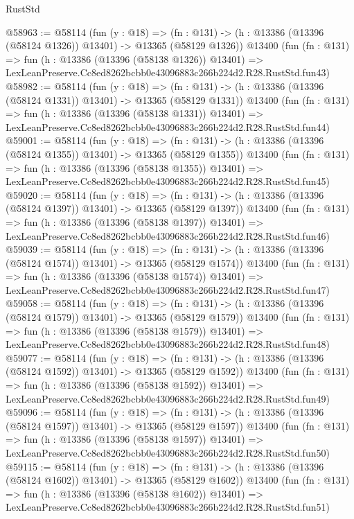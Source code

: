 \begin{lexlean}{RustStd}
\begin{coremodule}
@58963 := @58114
    (fun (y : @18) =>
    (fn : @131) -> (h : @13386 (@13396 (@58124 @1326)) @13401) -> @13365 (@58129 @1326))
    @13400
    (fun (fn : @131) =>
    fun (h : @13386 (@13396 (@58138 @1326)) @13401) =>
    LexLeanPreserve.Cc8ed8262bcbb0e43096883c266b224d2.R28.RustStd.fun43)
@58982 := @58114
    (fun (y : @18) =>
    (fn : @131) -> (h : @13386 (@13396 (@58124 @1331)) @13401) -> @13365 (@58129 @1331))
    @13400
    (fun (fn : @131) =>
    fun (h : @13386 (@13396 (@58138 @1331)) @13401) =>
    LexLeanPreserve.Cc8ed8262bcbb0e43096883c266b224d2.R28.RustStd.fun44)
@59001 := @58114
    (fun (y : @18) =>
    (fn : @131) -> (h : @13386 (@13396 (@58124 @1355)) @13401) -> @13365 (@58129 @1355))
    @13400
    (fun (fn : @131) =>
    fun (h : @13386 (@13396 (@58138 @1355)) @13401) =>
    LexLeanPreserve.Cc8ed8262bcbb0e43096883c266b224d2.R28.RustStd.fun45)
@59020 := @58114
    (fun (y : @18) =>
    (fn : @131) -> (h : @13386 (@13396 (@58124 @1397)) @13401) -> @13365 (@58129 @1397))
    @13400
    (fun (fn : @131) =>
    fun (h : @13386 (@13396 (@58138 @1397)) @13401) =>
    LexLeanPreserve.Cc8ed8262bcbb0e43096883c266b224d2.R28.RustStd.fun46)
@59039 := @58114
    (fun (y : @18) =>
    (fn : @131) -> (h : @13386 (@13396 (@58124 @1574)) @13401) -> @13365 (@58129 @1574))
    @13400
    (fun (fn : @131) =>
    fun (h : @13386 (@13396 (@58138 @1574)) @13401) =>
    LexLeanPreserve.Cc8ed8262bcbb0e43096883c266b224d2.R28.RustStd.fun47)
@59058 := @58114
    (fun (y : @18) =>
    (fn : @131) -> (h : @13386 (@13396 (@58124 @1579)) @13401) -> @13365 (@58129 @1579))
    @13400
    (fun (fn : @131) =>
    fun (h : @13386 (@13396 (@58138 @1579)) @13401) =>
    LexLeanPreserve.Cc8ed8262bcbb0e43096883c266b224d2.R28.RustStd.fun48)
@59077 := @58114
    (fun (y : @18) =>
    (fn : @131) -> (h : @13386 (@13396 (@58124 @1592)) @13401) -> @13365 (@58129 @1592))
    @13400
    (fun (fn : @131) =>
    fun (h : @13386 (@13396 (@58138 @1592)) @13401) =>
    LexLeanPreserve.Cc8ed8262bcbb0e43096883c266b224d2.R28.RustStd.fun49)
@59096 := @58114
    (fun (y : @18) =>
    (fn : @131) -> (h : @13386 (@13396 (@58124 @1597)) @13401) -> @13365 (@58129 @1597))
    @13400
    (fun (fn : @131) =>
    fun (h : @13386 (@13396 (@58138 @1597)) @13401) =>
    LexLeanPreserve.Cc8ed8262bcbb0e43096883c266b224d2.R28.RustStd.fun50)
@59115 := @58114
    (fun (y : @18) =>
    (fn : @131) -> (h : @13386 (@13396 (@58124 @1602)) @13401) -> @13365 (@58129 @1602))
    @13400
    (fun (fn : @131) =>
    fun (h : @13386 (@13396 (@58138 @1602)) @13401) =>
    LexLeanPreserve.Cc8ed8262bcbb0e43096883c266b224d2.R28.RustStd.fun51)

\end{coremodule}
\end{lexlean}
